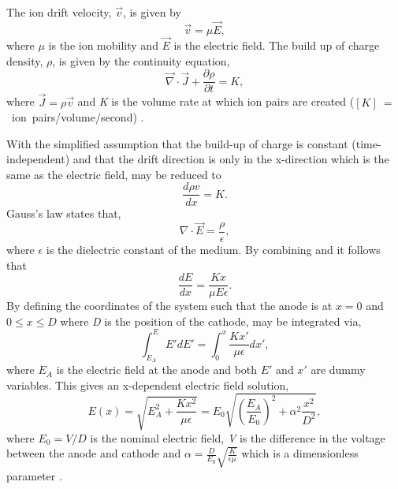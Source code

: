 The ion drift velocity, $\vec v$, is given by
\begin{equation}
    \vec v = \mu \vec E,
\end{equation}
where $\mu$ is the ion mobility and $\vec E$ is the electric field. The build up of charge density, $\rho$, is given by the continuity equation,
\begin{equation}
    \vec \nabla \cdot \vec J + \frac{\partial \rho}{\partial t} = K,
\label{eq:space_charge_continuity}
\end{equation}
where $\vec J = \rho \vec v$ and \textit{K} is the volume rate at which ion pairs are created \newline ($[K]~=~$~ion~pairs/volume/second) \cite{space_charge_math}. 

With the simplified assumption that the build-up of charge is constant (time-independent) and that the drift direction is only in the x-direction which is the same as the electric field,  may be reduced to 
\begin{equation}
    \frac{d \rho v}{dx} = K.
\label{eq:reduced_sapce_charge_continuity}
\end{equation}
Gauss's law states that,
\begin{equation}
    \nabla \cdot \vec E = \frac{\rho}{\epsilon},
\label{eq:Gauss's_law}
\end{equation}
where $\epsilon$ is the dielectric constant of the medium.
By combining  and  it follows that
\begin{equation}
    \frac{dE}{dx} = \frac{Kx}{\mu E \epsilon}.
\label{eq:sc_gauss_combo}
\end{equation}
By defining the coordinates of the system such that the anode is at $x = 0$ and $0 \leq x \leq D$ where \textit{D} is the position of the cathode,  may be integrated via,
\begin{equation}
    \int_{E_A}^E E'dE' = \int_0^x \frac{Kx'}{\mu \epsilon}dx',
\end{equation}
where $E_A$ is the electric field at the anode and both $E'$ and $x'$ are dummy variables. This gives an x-dependent electric field solution,
\begin{equation}
    E(x) = \sqrt{E^2_A + \frac{Kx^2}{\mu \epsilon}} = E_0 \sqrt{\left (\frac{E_A}{E_0}\right ) ^2 + \alpha^2 \frac{x^2}{D^2}},
\end{equation}
where $E_0 = V/D$ is the nominal electric field, \textit{V} is the difference in the voltage between the anode and cathode and $\alpha = \frac{D}{E_0}\sqrt{\frac{K}{\epsilon \mu}}$ which is a dimensionless parameter \cite{space_charge_math}.

